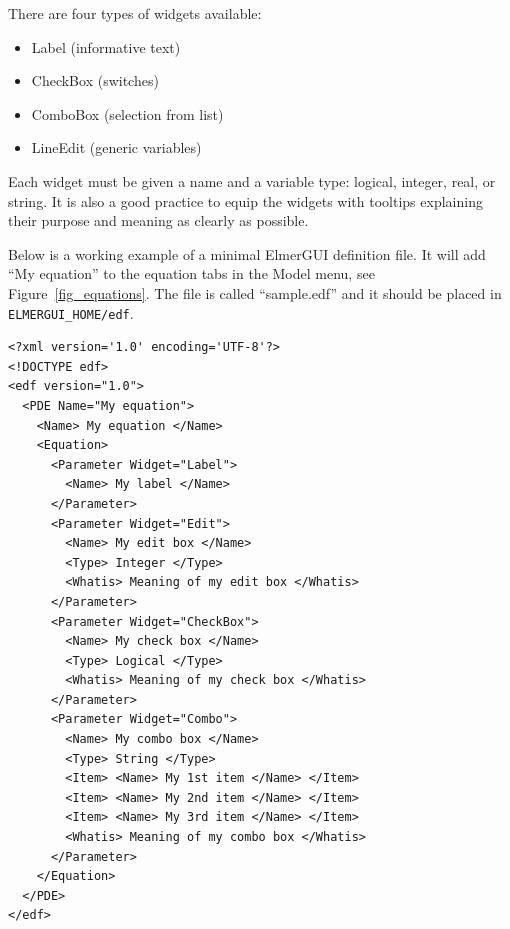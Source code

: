 There are four types of widgets available:
\begin{itemize}
 \item Label (informative text)
 \item CheckBox (switches)
 \item ComboBox (selection from list)
 \item LineEdit (generic variables)
\end{itemize}
Each widget must be given a name and a variable type: logical, integer, real, or  string. It is also a good practice to equip the widgets with tooltips explaining their purpose and meaning as clearly as possible.

Below is a working example of a minimal ElmerGUI definition file. It will add ``My equation'' to the equation tabs in the Model menu, see Figure~\ref{fig_equations}. The file is called ``sample.edf'' and it should be placed in {\tt ELMERGUI\_HOME/edf}.

\begin{footnotesize}
\begin{verbatim}
<?xml version='1.0' encoding='UTF-8'?>
<!DOCTYPE edf>
<edf version="1.0">
  <PDE Name="My equation">
    <Name> My equation </Name>
    <Equation>
      <Parameter Widget="Label">
        <Name> My label </Name>
      </Parameter>
      <Parameter Widget="Edit">
        <Name> My edit box </Name>
        <Type> Integer </Type>
        <Whatis> Meaning of my edit box </Whatis>
      </Parameter>
      <Parameter Widget="CheckBox">
        <Name> My check box </Name>
        <Type> Logical </Type>
        <Whatis> Meaning of my check box </Whatis>	  
      </Parameter>
      <Parameter Widget="Combo">
        <Name> My combo box </Name>
        <Type> String </Type>
        <Item> <Name> My 1st item </Name> </Item>
        <Item> <Name> My 2nd item </Name> </Item>
        <Item> <Name> My 3rd item </Name> </Item>
        <Whatis> Meaning of my combo box </Whatis>	  
      </Parameter>
    </Equation>
  </PDE>
</edf>
\end{verbatim}
\end{footnotesize}

